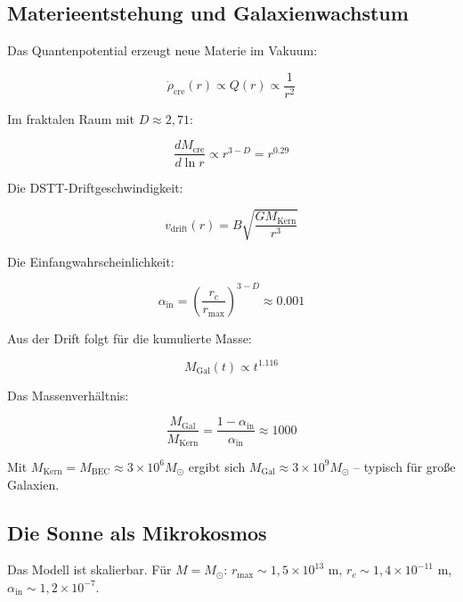 \documentclass[12pt,a4paper]{article}
\begin{document}
\subsection{Materieentstehung und Galaxienwachstum}

Das Quantenpotential erzeugt neue Materie im Vakuum:

\begin{equation}
\dot{\rho}_{\text{cre}}(r) \propto Q(r) \propto \frac{1}{r^2}
\end{equation}

Im fraktalen Raum mit $D \approx 2,71$:

\begin{equation}
\frac{dM_{\text{cre}}}{d\ln r} \propto r^{3-D} = r^{0.29}
\end{equation}

Die DSTT-Driftgeschwindigkeit:

\begin{equation}
v_{\text{drift}}(r) = B \sqrt{\frac{GM_{\text{Kern}}}{r^3}}
\end{equation}

Die Einfangwahrscheinlichkeit:

\begin{equation}
\alpha_{\text{in}} = \left( \frac{r_c}{r_{\text{max}}} \right)^{3-D} \approx 0.001
\end{equation}

Aus der Drift folgt für die kumulierte Masse:

\begin{equation}
M_{\text{Gal}}(t) \propto t^{1.116}
\end{equation}

Das Massenverhältnis:

\begin{equation}
\frac{M_{\text{Gal}}}{M_{\text{Kern}}} = \frac{1 - \alpha_{\text{in}}}{\alpha_{\text{in}}} \approx 1000
\end{equation}

Mit $M_{\text{Kern}} = M_{\text{BEC}} \approx 3 \times 10^6 M_{\odot}$ ergibt sich $M_{\text{Gal}} \approx 3 \times 10^9 M_{\odot}$ -- typisch für große Galaxien.

\subsection{Die Sonne als Mikrokosmos}

Das Modell ist skalierbar. Für $M = M_{\odot}$: $r_{\text{max}} \sim 1,5 \times 10^{13}$ m, $r_c \sim 1,4 \times 10^{-11}$ m, $\alpha_{\text{in}} \sim 1,2 \times 10^{-7}$.
\end{document}
